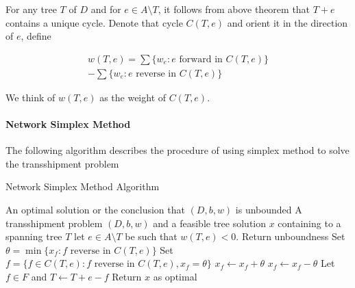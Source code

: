             For any tree $T$ of $D$ and for $e\in A\setminus T$, it follows from above theorem that $T+e$ contains a unique cycle. Denote that cycle $C(T, e)$ and orient it in the direction of $e$, define 

            \begin{eqnarray}
                w(T, e) = \sum\{w_e: e \text{ forward in } C(T, e)\} \nonumber \\ 
                        - \sum\{w_e: e \text{ reverse in } C(T, e)\}
            \end{eqnarray}

            We think of $w(T, e)$ as the weight of $C(T,e)$.

            \paragraph{Network Simplex Method} The following algorithm describes the procedure of using simplex method to solve the transshipment problem

                \begin{algorithm}[H]
                    \caption{Network Simplex Method Algorithm}
                    \begin{algorithmic}
                        \Ensure An optimal solution or the conclusion that $(D, b, w)$ is unbounded
                        \Require A transshipment problem $(D, b, w)$ and a feasible tree solution $x$ containing to a spanning tree $T$
                            \State let $e \in A \setminus T$ be such that $w(T, e) < 0$.
                                \State Return unboundness
                            \Else
                                \State Set $\theta = \min\{x_f: f \text{ reverse in } C(T, e)\}$
                                \State Set $f = \{f\in C(T, e): f \text{ reverse in } C(T, e), x_f = \theta\}$
                                    \State $x_f \gets x_f + \theta$
                                \Else
                                    \State $x_f \gets x_f - \theta$
                                \EndIf
                                \State Let $f \in F$ and $T \gets T+e-f$
                            \EndIf
                        \EndWhile
                        \State Return $x$ as optimal
                    \end{algorithmic}
                \end{algorithm}


